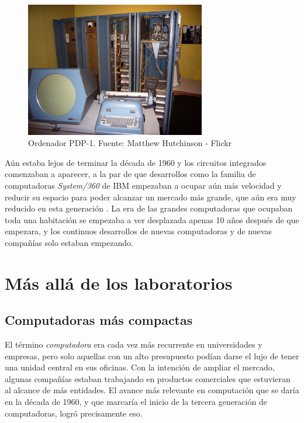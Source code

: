 \documentclass[letterpaper,12pt,oneside]{book}
\begin{document}
		\begin{figure}
		    \centering
		    \includegraphics[width=0.7\textwidth]{media/Historia/Wikimedia_PDP-1.jpeg}
		    \caption{Ordenador PDP-1. Fuente: Matthew Hutchinson - Flickr} %
	    	\label{fig:pdp1}
		\end{figure}
		
		Aún estaba lejos de terminar la década de 1960 y los circuitos integrados comenzaban a aparecer, a la par de que desarrollos como la familia
		de computadoras \textit{System/360} de IBM empezaban a ocupar aún más velocidad y reducir su espacio para poder alcanzar un mercado más grande, que aún era
		muy reducido en esta generación \cite{oregan_brief_2012}. La era de las grandes computadoras que ocupaban toda una habitación se empezaba a ver desplazada apenas 10 
		años después de que 	
		empezara, y los continuos desarrollos de nuevas computadoras y de nuevas compañías solo estaban empezando.
				
	\section{Más allá de los laboratorios}
		\subsection{Computadoras más compactas}
		

		El término \textit{computadora}	era cada vez más recurrente en universidades y empresas, pero solo aquellas con un alto presupuesto podían
		darse el lujo de tener una unidad central en sus oficinas. Con la intención de ampliar el mercado, algunas compañías estaban trabajando en productos
		comerciales que estuvieran al alcance de más entidades. El avance más relevante en computación que se daría en la década de 1960, y que marcaría el inicio de la tercera generación
		de computadoras, logró precisamente eso. 
  
\end{document}
